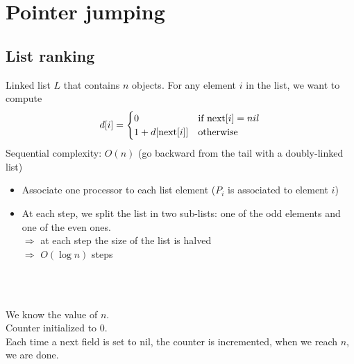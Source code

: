 \section{Pointer jumping}
\subsection{List ranking}

Linked list $L$ that contains $n$ objects. For any element $i$ in the list, we want to compute
\begin{align*}
d[i]=
\begin{cases}
0 & $if next$ [i]=nil \\
1+d[$next$[i]] & $otherwise$\\
\end{cases}
\end{align*}
Sequential complexity: $O(n)$ (go backward from the tail with a doubly-linked list)

\begin{itemize}
\item Associate one processor to each list element ($P_i$ is associated to element $i$)
\item At each step, we split the list in two sub-lists: one of the odd elements and one of the even ones.\\
$\Rightarrow$ at each step the size of the list is halved\\
$\Rightarrow$ $O(\log n)$ steps
\end{itemize}


\\
\begin{algorithm}[H]
\end{algorithm}

\\
We know the value of $n$.\\
Counter initialized to 0.\\
Each time a next field is set to nil, the counter is incremented, when we reach $n$, we are done.

\begin{algorithm}[H]
\end{algorithm}

